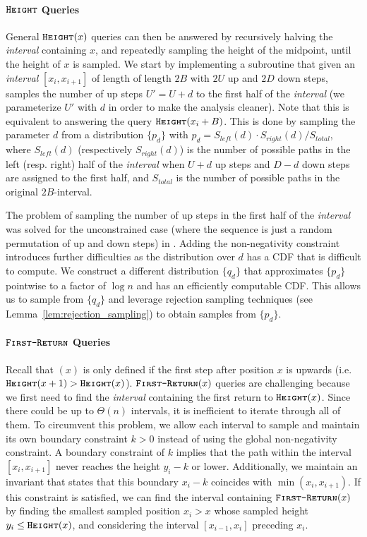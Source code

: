 \paragraph*{$\texttt{\textsc{Height}}$ Queries}
\label{par:height_queries}
General $\texttt{\textsc{Height}}(x)$ queries can then be answered by recursively halving the \emph{interval} containing $x$,
and repeatedly sampling the height of the midpoint, until the height of $x$ is sampled.
We start by implementing a subroutine that given an \emph{interval} $[x_i,x_{i+1}]$ of length of length $2B$ with $2U$ up and $2D$ down steps,
samples the number of up steps $U'=U+d$ to the first half of the \emph{interval}
(we parameterize $U'$ with $d$ in order to make the analysis cleaner).
Note that this is equivalent to answering the query $\texttt{\textsc{Height}}(x_i+B)$.
This is done by sampling the parameter $d$ from a distribution $\{ p_d\}$ with $p_d = S_{left}(d)\cdot S_{right}(d)/S_{total}$,
where $S_{left}(d)$ (respectively $S_{right}(d)$) is the number of possible paths in the left (resp. right) half of the \emph{interval} when
$U+d$ up steps and $D-d$ down steps are assigned to the first half, and $S_{total}$ is the number of possible paths in the original $2B$-interval.

The problem of sampling the number of up steps in the first half of the \emph{interval} was solved for the unconstrained case
(where the sequence is just a random permutation of up and down steps) in \cite{huge}.
Adding the non-negativity constraint introduces further difficulties as the distribution over $d$ has a CDF that is difficult to compute.
We construct a different distribution $\{q_d\}$ that approximates $\{p_d\}$ pointwise to a factor of $\log n$ and has an efficiently computable CDF.
This allows us to sample from $\{q_d\}$ and leverage rejection sampling techniques
(see Lemma~\ref{lem:rejection_sampling}) to obtain samples from $\{p_d\}$.

\paragraph*{$\texttt{\textsc{First-Return}}$ Queries}
\label{par:_first-return_queries}
Recall that $(x)$ is only defined if the first step after position $x$ is upwards (i.e. $\texttt{\textsc{Height}}(x+1) > \texttt{\textsc{Height}}(x)$).
$\texttt{\textsc{First-Return}}(x)$ queries are challenging because we first need to find the \emph{interval} containing the first return to $\texttt{\textsc{Height}}(x)$.
Since there could be up to $\Theta(n)$ intervals, it is inefficient to iterate through all of them.
To circumvent this problem, we allow each interval to sample and maintain its own boundary constraint $k>0$
instead of using the global non-negativity constraint.
A boundary constraint of $k$ implies that the path within the interval $[x_i,x_{i+1}]$ never reaches the height $y_i-k$ or lower.
Additionally, we maintain an invariant that states that this boundary $x_i-k$ coincides with $\min(x_i,x_{i+1})$.
If this constraint is satisfied, we can find the interval containing $\texttt{\textsc{First-Return}}(x)$ by finding the smallest sampled position $x_i>x$
whose sampled height $y_i \le \texttt{\textsc{Height}}(x)$, and considering the interval $[x_{i-1},x_i]$ preceding $x_i$.

